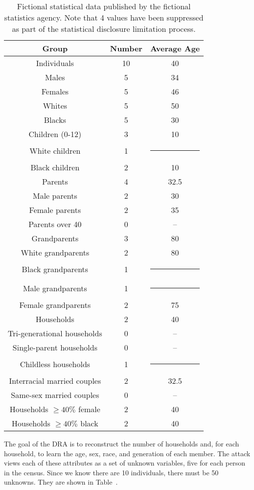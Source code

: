 \documentclass[runningheads]{llncs}
\begin{document}
\begin{table}
\begin{center}
\begin{tabular}{c|c|c}
Group & Number & Average Age \\
\hline
Individuals & 10 & 40 \\
Males & 5 & 34 \\
Females & 5 & 46 \\
Whites & 5 & 50 \\
Blacks & 5 & 30 \\
\hline
Children (0-12) & 3 & 10 \\
White children & 1 & \multicolumn{1}{c}{\rule{6mm}{3mm}} \\
Black children & 2 & 10 \\
\hline
Parents & 4 & 32.5 \\
Male parents & 2 & 30 \\
Female parents & 2 & 35 \\
Parents over 40 & 0 & -- \\
\hline
Grandparents & 3 & 80 \\
White grandparents & 2 & 80 \\
Black grandparents & 1 & \multicolumn{1}{c}{\rule{6mm}{3mm}} \\
Male grandparents & 1 & \multicolumn{1}{c}{\rule{6mm}{3mm}} \\
Female grandparents & 2 & 75 \\
\hline
Households & 2 & 40 \\
Tri-generational households & 0 & -- \\
Single-parent households & 0 & -- \\
Childless households & 1 & \multicolumn{1}{c}{\rule{6mm}{3mm}} \\
Interracial married couples & 2 & 32.5 \\
Same-sex married couples & 0 & -- \\
Households $\geq 40\% $ female & 2 & 40 \\
Households $\geq 40\% $ black & 2 & 40 \\
\hline
\end{tabular}
\end{center}
\caption{Fictional statistical data published by the fictional
  statistics agency. Note that 4 values have been suppressed as part
  of the statistical disclosure limitation process.}\label{publishedstatsbig}
\end{table}

The goal of the DRA is to reconstruct the number of households and,
for each household, to learn the age, sex, race, and generation of
each member. The attack views each of these attributes as a set of
unknown variables, five for each person in the census. Since we know
there are 10 individuals, there must be 50 unknowns. They are shown in
Table~\label{unknownssmall}. 
\end{document}
